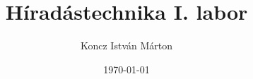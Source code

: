\documentclass[12pt, a4paper]{article}
\begin{document}
\title{Híradástechnika I. labor}
\author{Koncz István Márton}
\date{\today}
\maketitle
\newpage



\tableofcontents
\end{document}
